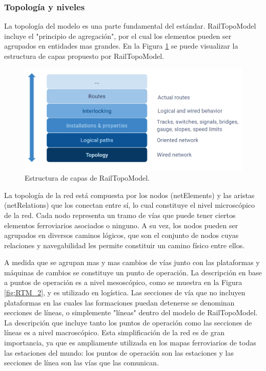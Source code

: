 \subsubsection{Topología y niveles}

    La topología del modelo es una parte fundamental del estándar. RailTopoModel incluye el "principio de agregación", por el cual los elementos pueden ser agrupados en entidades mas grandes. En la Figura \ref{fig:RTM_1} se puede visualizar la estructura de capas propuesto por RailTopoModel.

    \begin{figure}[!h]
        \centering
        \includegraphics[width=1\textwidth]{Figuras/capas}
        \centering\caption{Estructura de capas de RailTopoModel.}
        \label{fig:RTM_1}
    \end{figure}
    
    La topología de la red está compuesta por los nodos (netElements) y las aristas (netRelations) que los conectan entre sí, lo cual constituye el nivel microscópico de la red. Cada nodo representa un tramo de vías que puede tener ciertos elementos ferroviarios asociados o ninguno. A su vez, los nodos pueden ser agrupados en diversos caminos lógicos, que son el conjunto de nodos cuyas relaciones y navegabilidad les permite constituir un camino físico entre ellos.

    A medida que se agrupan mas y mas cambios de vías junto con las plataformas y máquinas de cambios se constituye un punto de operación. La descripción en base a puntos de operación es a nivel mesoscópico, como se muestra en la Figura \ref{fig:RTM_2}, y es utilizado en logística. Las secciones de vía que no incluyen plataformas en las cuales las formaciones puedan detenerse se denominan secciones de líneas, o simplemente "líneas" dentro del modelo de RailTopoModel. La descripción que incluye tanto los puntos de operación como las secciones de líneas es a nivel macroscópico. Esta simplificación de la red es de gran importancia, ya que es ampliamente utilizada en los mapas ferroviarios de todas las estaciones del mundo: los puntos de operación son las estaciones y las secciones de línea son las vías que las comunican. 
    
